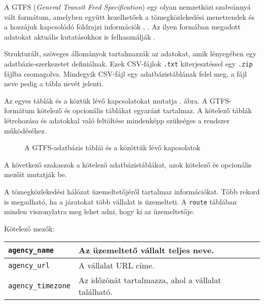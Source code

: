
A GTFS (\textit{General Transit Feed Specification}) egy olyan nemzetközi szabvánnyá vált formátum, amelyben együtt kezelhetőek a tömegközlekedési menetrendek és a hozzájuk kapcsolódó földrajzi információk \cite{gtfs}, \cite{gtfsspec}. Az ilyen formában megadott adatokat aktuális kutatásokhoz is felhasználják \cite{crowdsending}.

Strukturált, szöveges állományok tartalmazzák az adatokat, amik lényegében egy adatbázis-szerkezetet definiálnak. Ezek CSV-fájlok \texttt{.txt} kiterjesztéssel egy \texttt{.zip} fájlba csomagolva. Mindegyik CSV-fájl egy adatbázistáblának felel meg, a fájl neve pedig a tábla nevét jelenti.

Az egyes táblák és a köztük lévő kapcsolatokat mutatja . ábra. A GTFS-formátum kötelező és opcionális táblákat egyaránt tartalmaz. A kötelező táblák létrehozása és adatokkal való feltöltése mindenképp szükséges a rendszer működéséhez.


\begin{figure}
\centering

\caption{A GTFS-adatbázis táblái és a közöttük lévő kapcsolatok}
\label{fig:gtfs}
\end{figure}


A következő szakaszok a kötelező adatbázistáblákat, azok kötelező és opcionális mezőit mutatják be.


A tömegközlekedési hálózat üzemeltetőjéről tartalmaz információkat. Több rekord is megadható, ha a járatokat több vállalat is üzemelteti. A \texttt{route} táblában minden viszonylatra meg lehet adni, hogy ki az üzemeltetője.

\medskip

\noindent Kötelező mezők:

\bigskip

\begin{tabular}{|p{3.5cm}|p{10cm}|}
\hline
\texttt{agency\_name} & Az üzemeltető vállalt teljes neve. \\
\hline
\texttt{agency\_url} & A vállalat URL címe. \\
\hline
\texttt{agency\_timezone} & Az időzónát tartalmazza, ahol a vállalat található. \\
\hline
\end{tabular}

